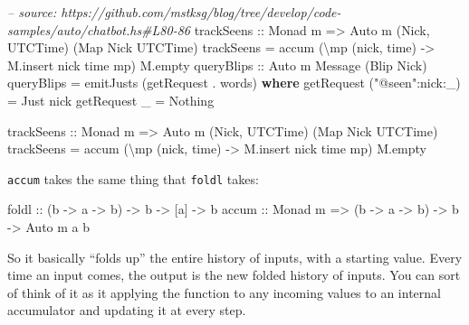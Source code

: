 \documentclass[]{article}
\newenvironment{Shaded}{}{}
\newcommand{\KeywordTok}[1]{\textcolor[rgb]{0.00,0.44,0.13}{\textbf{{#1}}}}
\newcommand{\DataTypeTok}[1]{\textcolor[rgb]{0.56,0.13,0.00}{{#1}}}
\newcommand{\StringTok}[1]{\textcolor[rgb]{0.25,0.44,0.63}{{#1}}}
\newcommand{\CommentTok}[1]{\textcolor[rgb]{0.38,0.63,0.69}{\textit{{#1}}}}
\newcommand{\OtherTok}[1]{\textcolor[rgb]{0.00,0.44,0.13}{{#1}}}
\newcommand{\FunctionTok}[1]{\textcolor[rgb]{0.02,0.16,0.49}{{#1}}}
\newcommand{\NormalTok}[1]{{#1}}
\begin{document}
\begin{Shaded}
\begin{Highlighting}[]
\CommentTok{-- source: https://github.com/mstksg/blog/tree/develop/code-samples/auto/chatbot.hs#L80-86}
\OtherTok{    trackSeens ::} \DataTypeTok{Monad} \NormalTok{m }\OtherTok{=>} \DataTypeTok{Auto} \NormalTok{m (}\DataTypeTok{Nick}\NormalTok{, }\DataTypeTok{UTCTime}\NormalTok{) (}\DataTypeTok{Map} \DataTypeTok{Nick} \DataTypeTok{UTCTime}\NormalTok{)}
    \NormalTok{trackSeens }\FunctionTok{=} \NormalTok{accum (\textbackslash{}mp (nick, time) }\OtherTok{->} \NormalTok{M.insert nick time mp) M.empty}
\OtherTok{    queryBlips ::} \DataTypeTok{Auto} \NormalTok{m }\DataTypeTok{Message} \NormalTok{(}\DataTypeTok{Blip} \DataTypeTok{Nick}\NormalTok{)}
    \NormalTok{queryBlips }\FunctionTok{=} \NormalTok{emitJusts (getRequest }\FunctionTok{.} \NormalTok{words)}
      \KeywordTok{where}
        \NormalTok{getRequest (}\StringTok{"@seen"}\FunctionTok{:}\NormalTok{nick}\FunctionTok{:}\NormalTok{_) }\FunctionTok{=} \DataTypeTok{Just} \NormalTok{nick}
        \NormalTok{getRequest _                }\FunctionTok{=} \DataTypeTok{Nothing}



\OtherTok{trackSeens ::} \DataTypeTok{Monad} \NormalTok{m }\OtherTok{=>} \DataTypeTok{Auto} \NormalTok{m (}\DataTypeTok{Nick}\NormalTok{, }\DataTypeTok{UTCTime}\NormalTok{) (}\DataTypeTok{Map} \DataTypeTok{Nick} \DataTypeTok{UTCTime}\NormalTok{)}
\NormalTok{trackSeens }\FunctionTok{=} \NormalTok{accum (\textbackslash{}mp (nick, time) }\OtherTok{->} \NormalTok{M.insert nick time mp) M.empty}
\end{Highlighting}
\end{Shaded}

\texttt{accum} takes the same thing that \texttt{foldl} takes:

\begin{Shaded}
\begin{Highlighting}[]
\NormalTok{foldl}\OtherTok{ ::}            \NormalTok{(b }\OtherTok{->} \NormalTok{a }\OtherTok{->} \NormalTok{b) }\OtherTok{->} \NormalTok{b }\OtherTok{->} \NormalTok{[a] }\OtherTok{->} \NormalTok{b}
\OtherTok{accum ::} \DataTypeTok{Monad} \NormalTok{m }\OtherTok{=>} \NormalTok{(b }\OtherTok{->} \NormalTok{a }\OtherTok{->} \NormalTok{b) }\OtherTok{->} \NormalTok{b }\OtherTok{->} \DataTypeTok{Auto} \NormalTok{m a b}
\end{Highlighting}
\end{Shaded}

So it basically ``folds up'' the entire history of inputs, with a starting
value. Every time an input comes, the output is the new folded history of
inputs. You can sort of think of it as it applying the function to any incoming
values to an internal accumulator and updating it at every step.
\end{document}
